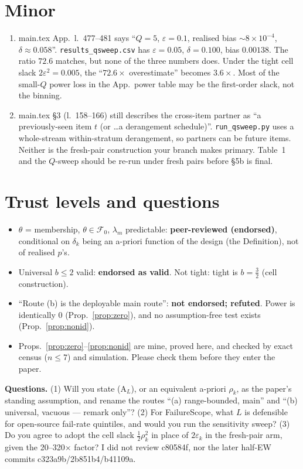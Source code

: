 \documentclass[11pt]{article}
\begin{document}
\section{Minor}\label{sec:minor}
\begin{enumerate}[nosep]
\item main.tex App.\ l.~477--481 says ``$Q=5$, $\varepsilon=0.1$, realised bias $\sim8\times10^{-4}$, $\delta\approx0.058$''. \texttt{results\_qsweep.csv} has $\varepsilon=0.05$, $\delta=0.100$, bias $0.00138$. The ratio $72.6$ matches, but none of the three numbers does. Under the tight cell slack $2\varepsilon^2=0.005$, the ``$72.6\times$ overestimate'' becomes $3.6\times$. Most of the small-$Q$ power loss in the App.\ power table may be the first-order slack, not the binning.
\item main.tex \S3 (l.~158--166) still describes the cross-item partner as ``a previously-seen item $t$ (or \ldots a derangement schedule)''. \texttt{run\_qsweep.py} uses a whole-stream within-stratum derangement, so partners can be future items. Neither is the fresh-pair construction your branch makes primary. Table~1 and the $Q$-sweep should be re-run under fresh pairs before \S5b is final.
\end{enumerate}

\section{Trust levels and questions}
\begin{itemize}[nosep]
\item $\theta$ = membership, $\theta\in\mathcal F_0$, $\lambda_m$ predictable: \textbf{peer-reviewed (endorsed)}, conditional on $\delta_k$ being an a-priori function of the design (the Definition), not of realised $p$'s.
\item Universal $b\le2$ valid: \textbf{endorsed as valid}. Not tight: tight is $b=\frac32$ (cell construction).
\item ``Route (b) is the deployable main route'': \textbf{not endorsed; refuted}. Power is identically $0$ (Prop.~\ref{prop:zero}), and no assumption-free test exists (Prop.~\ref{prop:nonid}).
\item Props.~\ref{prop:zero}--\ref{prop:nonid} are mine, proved here, and checked by exact census ($n\le7$) and simulation. Please check them before they enter the paper.
\end{itemize}
\textbf{Questions.} (1) Will you state (A$_L$), or an equivalent a-priori $\rho_k$, as the paper's standing assumption, and rename the routes ``(a) range-bounded, main'' and ``(b) universal, vacuous --- remark only''? (2) For FailureScope, what $L$ is defensible for open-source fail-rate quintiles, and would you run the sensitivity sweep? (3) Do you agree to adopt the cell slack $\frac12\rho_k^2$ in place of $2\varepsilon_k$ in the fresh-pair arm, given the 20--320$\times$ factor? I did not review c80584f, nor the later half-EW commits c323a9b/2b851b4/b41109a.
\end{document}
